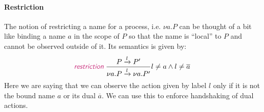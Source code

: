 \documentclass{article}
\theoremstyle{definition}
\newcommand{\trule}[1]{\textcolor{labelColor}{\textit{\textsf{#1}}}\;}
\begin{document}
\paragraph{Restriction}

The notion of restricting a name for a process, i.e. $\nu a . P$
can be thought of a bit like binding a name $a$ in the scope of $P$
so that the name is ``local'' to $P$ and cannot be observed outside of
it. Its semantics is given by:
%
\begin{align*}
  \trule{restriction}\dfrac{P \xrightarrow{l} P'}
{\nu a . P \xrightarrow{l} \nu a . P'} {l \neq a \wedge l \neq \overline{a}}
\end{align*}
%
Here we are saying that we can observe the action given
by label $l$ only if it is not the bound name $a$ or its dual
$\overline{a}$. We can use this to enforce handshaking
of dual actions.
\end{document}

